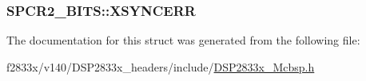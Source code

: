 \subsubsection[{X\+S\+Y\+N\+C\+E\+R\+R}]{ S\+P\+C\+R2\+\_\+\+B\+I\+T\+S\+::\+X\+S\+Y\+N\+C\+E\+R\+R}\label{struct_s_p_c_r2___b_i_t_s_a5e21593f6ae0f59c5116746fa44c6a0c}


The documentation for this struct was generated from the following file\+:\begin{DoxyCompactItemize}
\item 
f2833x/v140/\+D\+S\+P2833x\+\_\+headers/include/\hyperlink{_d_s_p2833x___mcbsp_8h}{D\+S\+P2833x\+\_\+\+Mcbsp.\+h}\end{DoxyCompactItemize}
